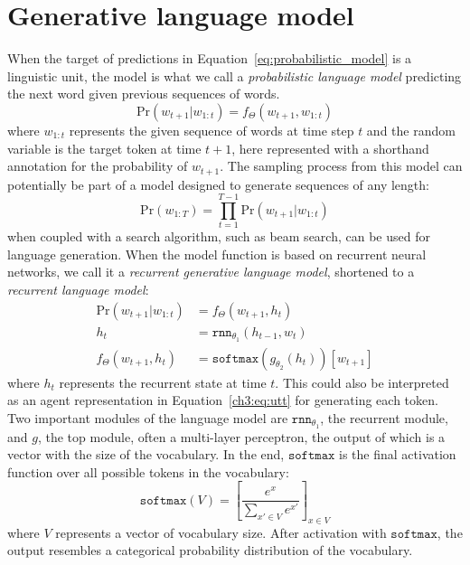 \section{Generative language model}
\label{sec:concepts:glm}
When the target of predictions in Equation~\ref{eq:probabilistic_model} is a linguistic unit, the model is what we call a \emph{probabilistic language model} \textemdash predicting the next word given previous sequences of words.
\begin{equation}\label{ch3:eq:lm0}
\mathrm{Pr}( w_{t+1} | w_{1:t} ) = f_{\Theta}(w_{t+1}, w_{1:t})
\end{equation}
\noindent where $w_{1:t}$ represents the given sequence of words at time step $t$ and the random variable is the target token at time $t+1$, here represented with a shorthand annotation for the probability of $w_{t+1}$. The sampling process from this model can potentially be part of a model designed to generate sequences of any length:
\begin{equation}\label{ch3:eq:lm}
\mathrm{Pr}( w_{1:T} ) = \prod_{t=1}^{T-1} \mathrm{Pr}( w_{t+1} | w_{1:t} )
\end{equation}
\noindent when coupled with a search algorithm, such as beam search, can be used for language generation. When the model function is based on recurrent neural networks, we call it a \emph{recurrent generative language model}, shortened to a \emph{recurrent language model}:
\begin{align}
\mathrm{Pr}( w_{t+1} | w_{1:t} ) &= f_{\Theta}(w_{t+1}, h_t) \\
h_t &= \mathtt{rnn}_{\theta_1}(h_{t-1}, w_t) \\
f_{\Theta}(w_{t+1}, h_t) &= \mathtt{softmax}(g_{\theta_2}(h_t))[w_{t+1}]
\end{align}
\noindent where $h_t$ represents the recurrent state at time $t$. 
This could also be interpreted as an agent representation in Equation~\ref{ch3:eq:utt} for generating each token. 
Two important modules of the language model are  $\mathtt{rnn}_{\theta_1}$, the recurrent module, and $g$, the top module, often a multi-layer perceptron, the output of which is a vector with the size of the vocabulary. In the end, $\mathtt{softmax}$ is the final activation function over all possible tokens in the vocabulary:
\begin{equation}
\mathtt{softmax}(V) = [\frac{e^{x}}{\sum\limits_{x' \in V}{e^{x'}}}]_{x \in V}
\end{equation}
\noindent where $V$ represents a vector of vocabulary size. After activation with $\mathtt{softmax}$, the output resembles a categorical probability distribution of the vocabulary.
